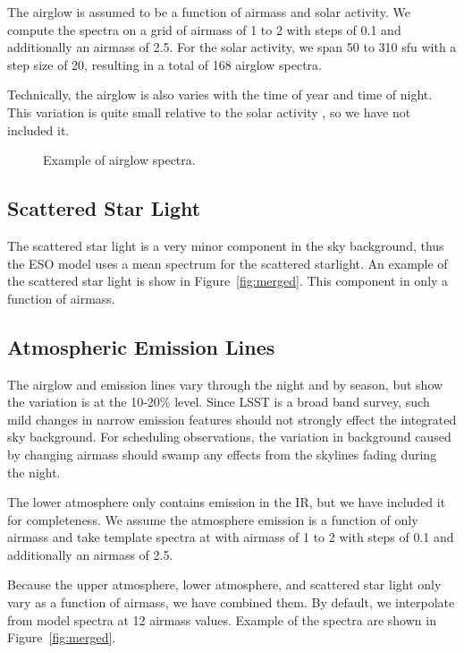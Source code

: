 \documentclass{emulateapj}  %
\begin{document}
The airglow is assumed to be a function of airmass and solar activity.  We compute the spectra on a grid of airmass of 1 to 2 with steps of 0.1 and additionally an airmass of 2.5.  For the solar activity, we span 50 to 310 sfu with a step size of 20, resulting in a total of 168 airglow spectra. 

Technically, the airglow is also varies with the time of year and time of night.  This variation is quite small relative to the solar activity \citep{Noll12}, so we have not included it.

\begin{figure}
  \caption{Example of airglow spectra. \label{fig:airglow}}
\end{figure}

  

\subsection{Scattered Star Light}

The scattered star light is a very minor component in the sky background, thus the ESO model uses a mean spectrum for the scattered starlight.  An example of the scattered star light is show in Figure~\ref{fig:merged}. This component in only a function of airmass.


\subsection{Atmospheric Emission Lines}

The airglow and emission lines vary through the night and by season, but \citet{Noll12} show the variation is at the 10-20\% level.  Since LSST is a broad band survey, such mild changes in narrow emission features should not strongly effect the integrated sky background.  For scheduling observations, the variation in background caused by changing airmass should swamp any effects from the skylines fading during the night.

The lower atmosphere only contains emission in the IR, but we have included it for completeness.  We assume the atmosphere emission is a function of only airmass and take template spectra at with airmass of 1 to 2 with steps of 0.1 and additionally an airmass of 2.5.

Because the upper atmosphere, lower atmosphere, and scattered star light only vary as a function of airmass, we have combined them. By default, we interpolate from model spectra at 12 airmass values.  Example of the spectra are shown in Figure~\ref{fig:merged}.
\end{document}
